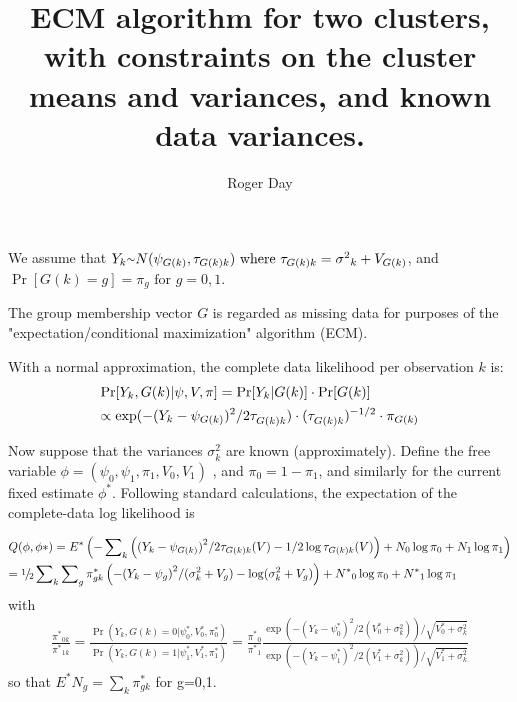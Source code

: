 \documentclass[12pt]{article}
\newcommand{\mytilde}{\raise.17ex\hbox{$\scriptstyle\mathtt{\sim}$}}
\begin{document}

\title{ECM algorithm for two clusters, with constraints on the cluster means and variances, and known data variances.}
\author{Roger Day}

\maketitle
We assume that ${Y_k} \mytilde N({\psi _{G(k)}},{\tau _{G(k)k}}){\text{  where  }}{\tau _{G(k)k}} = {\sigma ^2}_k + {V_{G(k)}}$,
and $\Pr [G(k) = g] = \pi _g{\text{ for }}g = 0,1$.

The group membership vector $G$ is  regarded as missing data for purposes of the "expectation/conditional maximization" algorithm (ECM). 

With a normal approximation, the complete data likelihood per observation $k$ is:
\[\begin{gathered}
\Pr [{Y_k},G(k)|\psi ,V,\pi ] = \Pr [{Y_k}|G(k)] \cdot \Pr [G(k)] \hfill \\
\propto \exp ( - {({Y_k} - {\psi _{G(k)}})^2}/2\tau _{G(k)k}^{}) \cdot {(\tau _{G(k)k}^{})^{ - 1/2}} \cdot {\pi _{G(k)}} \hfill \\ 
\end{gathered} \]

Now suppose that the variances $\sigma ^2 _k$   are known (approximately). Define the free variable $\phi  = ({\psi _0},{\psi _1},{\pi _1},{V_0},{V_1})$ , and  ${\pi _0} = 1 - {\pi _1}$, and similarly for the current fixed estimate  ${\phi ^*}$.   Following standard calculations, the expectation of the complete-data log likelihood is

\[\begin{gathered}
  Q(\phi ,\phi *) = {E^*}\left( { - \sum\nolimits_k {\left( {{{({Y_k} - {\psi _{G(k)}})}^2}/2{\tau _{G(k)k}}(V) - 1/2\log {\tau _{G(k)k}}(V)} \right)}  + {N_0}\log {\pi _0} + {N_1}\log {\pi _1}} \right) \hfill \\
   = \raise.5ex\hbox{$\scriptstyle 1$}\kern-.1em/
 \kern-.15em\lower.25ex\hbox{$\scriptstyle 2$} \sum\nolimits_k {\sum\nolimits_g {\pi _{gk}^*\left( { - {{({Y_k} - {\psi _g})}^2}/(\sigma _k^2 + {V_g}) - \log (\sigma _k^2 + {V_g})} \right)} }  + {N^*}_0\log {\pi _0} + {N^*}_1\log {\pi _1} \hfill \\ 
\end{gathered} \]
with
\[\begin{gathered}
\frac{{{\pi ^*}_{0k}}}{{{\pi ^*}_{1k}}} = \frac{{\Pr ({Y_k},G(k) = 0|\psi _0^*,V_0^*,\pi _0^*)}}{{\Pr ({Y_k},G(k) = 1|\psi _1^*,V_1^*,\pi _1^*)}} = \frac{{{\pi ^*}_0}}{{{\pi ^*}_1}}\frac{{\exp \left( { - {{({Y_k} - \psi _0^*)}^2}/2(V_0^* + \sigma _k^2)} \right)/\sqrt {V_0^* + \sigma _k^2} }}{{\exp \left( { - {{({Y_k} - \psi _1^*)}^2}/2(V_1^* + \sigma _k^2)} \right)/\sqrt {V_1^* + \sigma _k^2} }}
\end{gathered} \]
so that ${E^*}{N_g} = \sum\limits_k {\pi _{gk}^*} $  for g=0,1.
\end{document}
